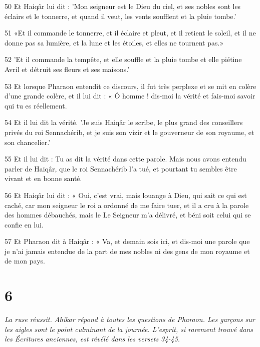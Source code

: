 \par 50 Et Haiqâr lui dit : 'Mon seigneur est le Dieu du ciel, et ses nobles sont les éclairs et le tonnerre, et quand il veut, les vents soufflent et la pluie tombe.'

\par 51 «Et il commande le tonnerre, et il éclaire et pleut, et il retient le soleil, et il ne donne pas sa lumière, et la lune et les étoiles, et elles ne tournent pas.»

\par 52 'Et il commande la tempête, et elle souffle et la pluie tombe et elle piétine Avril et détruit ses fleurs et ses maisons.'

\par 53 Et lorsque Pharaon entendit ce discours, il fut très perplexe et se mit en colère d'une grande colère, et il lui dit : « Ô homme ! dis-moi la vérité et fais-moi savoir qui tu es réellement.

\par 54 Et il lui dit la vérité. 'Je suis Haiqâr le scribe, le plus grand des conseillers privés du roi Sennachérib, et je suis son vizir et le gouverneur de son royaume, et son chancelier.'

\par 55 Et il lui dit : Tu as dit la vérité dans cette parole. Mais nous avons entendu parler de Haiqâr, que le roi Sennachérib l'a tué, et pourtant tu sembles être vivant et en bonne santé.

\par 56 Et Haiqâr lui dit : « Oui, c'est vrai, mais louange à Dieu, qui sait ce qui est caché, car mon seigneur le roi a ordonné de me faire tuer, et il a cru à la parole des hommes débauchés, mais le Le Seigneur m'a délivré, et béni soit celui qui se confie en lui.

\par 57 Et Pharaon dit à Haiqâr : « Va, et demain sois ici, et dis-moi une parole que je n'ai jamais entendue de la part de mes nobles ni des gens de mon royaume et de mon pays.

\chapter{6}

\par \textit{La ruse réussit. Ahikar répond à toutes les questions de Pharaon. Les garçons sur les aigles sont le point culminant de la journée. L'esprit, si rarement trouvé dans les Écritures anciennes, est révélé dans les versets 34-45.}

